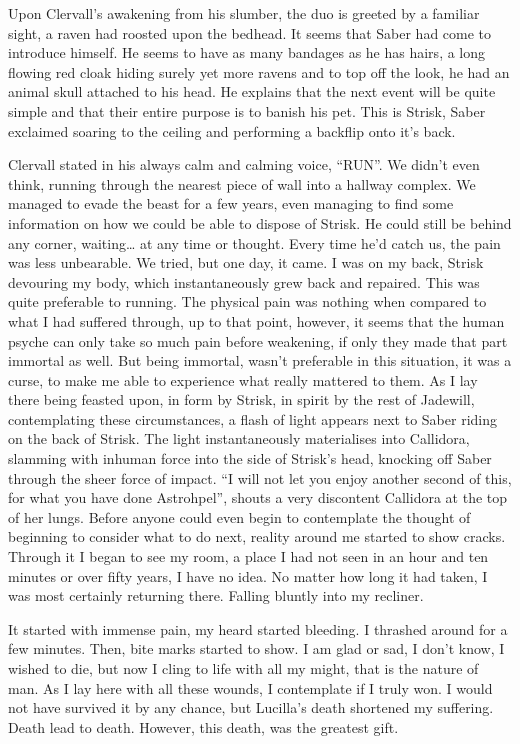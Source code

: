 Upon Clervall's awakening from his slumber, the duo is greeted by a
familiar sight, a raven had roosted upon the bedhead. It seems that
Saber had come to introduce himself. He seems to have as many bandages
as he has hairs, a long flowing red cloak hiding surely yet more ravens
and to top off the look, he had an animal skull attached to his head. He
explains that the next event will be quite simple and that their entire
purpose is to banish his pet. This is Strisk, Saber exclaimed soaring to
the ceiling and performing a backflip onto it's back.

Clervall stated in his always calm and calming voice, ``RUN''. We didn't
even think, running through the nearest piece of wall into a hallway
complex. We managed to evade the beast for a few years, even managing to
find some information on how we could be able to dispose of Strisk. He
could still be behind any corner, waiting\ldots{} at any time or
thought. Every time he'd catch us, the pain was less unbearable. We
tried, but one day, it came. I was on my back, Strisk devouring my body,
which instantaneously grew back and repaired. This was quite preferable
to running. The physical pain was nothing when compared to what I had
suffered through, up to that point, however, it seems that the human
psyche can only take so much pain before weakening, if only they made
that part immortal as well. But being immortal, wasn't preferable in
this situation, it was a curse, to make me able to experience what
really mattered to them. As I lay there being feasted upon, in form by
Strisk, in spirit by the rest of Jadewill, contemplating these
circumstances, a flash of light appears next to Saber riding on the back
of Strisk. The light instantaneously materialises into Callidora,
slamming with inhuman force into the side of Strisk's head, knocking off
Saber through the sheer force of impact. ``I will not let you enjoy
another second of this, for what you have done Astrohpel'', shouts a
very discontent Callidora at the top of her lungs. Before anyone could
even begin to contemplate the thought of beginning to consider what to
do next, reality around me started to show cracks. Through it I began to
see my room, a place I had not seen in an hour and ten minutes or over
fifty years, I have no idea. No matter how long it had taken, I was most
certainly returning there. Falling bluntly into my recliner.

It started with immense pain, my heard started bleeding. I thrashed
around for a few minutes. Then, bite marks started to show. I am glad or
sad, I don't know, I wished to die, but now I cling to life with all my
might, that is the nature of man. As I lay here with all these wounds, I
contemplate if I truly won. I would not have survived it by any chance,
but Lucilla's death shortened my suffering. Death lead to death.
However, this death, was the greatest gift.
